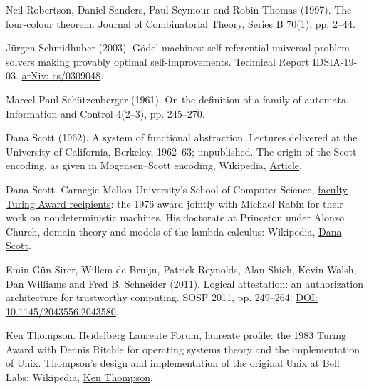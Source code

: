 \documentclass[11pt,twoside]{article}
\theoremstyle{thielethm}
\theoremstyle{thieledef}
\theoremstyle{thieledef}
\theoremstyle{thieledef}
\theoremstyle{thielethm}
\theoremstyle{thieleobs}
\theoremstyle{thielethm}
\begin{document}
\noindent Neil Robertson, Daniel Sanders, Paul Seymour and Robin Thomas (1997). The four-colour theorem. Journal of Combinatorial Theory, Series B 70(1), pp. 2--44.
\par\medskip

\noindent Jürgen Schmidhuber (2003). Gödel machines: self-referential universal problem solvers making provably optimal self-improvements. Technical Report IDSIA-19-03. \href{https://arxiv.org/abs/cs/0309048}{arXiv: cs/0309048}.
\par\medskip

\noindent Marcel-Paul Schützenberger (1961). On the definition of a family of automata. Information and Control 4(2--3), pp. 245--270.
\par\medskip

\noindent Dana Scott (1962). A system of functional abstraction. Lectures delivered at the University of California, Berkeley, 1962--63; unpublished. The origin of the Scott encoding, as given in Mogensen--Scott encoding, Wikipedia, \href{https://en.wikipedia.org/wiki/Mogensen\%E2\%80\%93Scott_encoding}{Article}.
\par\medskip

\noindent Dana Scott. Carnegie Mellon University's School of Computer Science, \href{https://www.cs.cmu.edu/~scsfacts/turing.html}{faculty Turing Award recipients}: the 1976 award jointly with Michael Rabin for their work on nondeterministic machines. His doctorate at Princeton under Alonzo Church, domain theory and models of the lambda calculus: Wikipedia, \href{https://en.wikipedia.org/wiki/Dana_Scott}{Dana Scott}.
\par\medskip

\noindent Emin G\"un Sirer, Willem de Bruijn, Patrick Reynolds, Alan Shieh, Kevin Walsh, Dan Williams and Fred B. Schneider (2011). Logical attestation: an authorization architecture for trustworthy computing. SOSP 2011, pp. 249--264. \href{https://doi.org/10.1145/2043556.2043580}{DOI: 10.1145/2043556.2043580}.
\par\medskip

\noindent Ken Thompson. Heidelberg Laureate Forum, \href{https://www.heidelberg-laureate-forum.org/laureate/ken-thompson/}{laureate profile}: the 1983 Turing Award with Dennis Ritchie for operating systems theory and the implementation of Unix. Thompson's design and implementation of the original Unix at Bell Labs: Wikipedia, \href{https://en.wikipedia.org/wiki/Ken_Thompson}{Ken Thompson}.
\par\medskip
\end{document}
